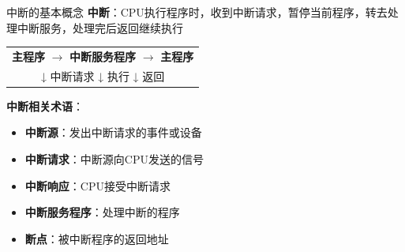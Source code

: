 \documentclass[10pt, aspectratio=169]{beamer}
\begin{document}
\begin{frame}{中断的基本概念}
    \textbf{中断}：CPU执行程序时，收到中断请求，暂停当前程序，转去处理中断服务，处理完后返回继续执行
    \vspace{0.3em}
    \begin{center}
        \begin{tabular}{c}
            \textbf{主程序} \quad $\longrightarrow$ \quad \textbf{中断服务程序} \quad $\longrightarrow$ \quad \textbf{主程序} \\
            ↓ 中断请求  \quad \quad \quad \quad ↓ 执行  \quad \quad \quad \quad \quad ↓ 返回
        \end{tabular}
    \end{center}
    \vspace{0.3em}
    \textbf{中断相关术语}：
    \begin{itemize}
        \item \textbf{中断源}：发出中断请求的事件或设备
        \item \textbf{中断请求}：中断源向CPU发送的信号
        \item \textbf{中断响应}：CPU接受中断请求
        \item \textbf{中断服务程序}：处理中断的程序
        \item \textbf{断点}：被中断程序的返回地址
    \end{itemize}
\end{frame}
\end{document}
